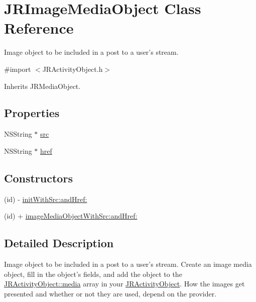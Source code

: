 \hypertarget{interface_j_r_image_media_object}{
\section{JRImageMediaObject Class Reference}
\label{interface_j_r_image_media_object}
}


Image object to be included in a post to a user's stream.  




{\ttfamily \#import $<$JRActivityObject.h$>$}



Inherits JRMediaObject.

\subsection*{Properties}
\begin{DoxyCompactItemize}
\item 
NSString $\ast$ \hyperlink{interface_j_r_image_media_object_aad75823f9189dfca758bc4d4712c3621}{src}
\item 
NSString $\ast$ \hyperlink{interface_j_r_image_media_object_a95642c3f4bc97a112a3ab32beef46f66}{href}
\end{DoxyCompactItemize}
\subsection*{Constructors}
\label{_amgrp559a25fdb98a7d1fd1c3771ac568d5e9}
 \begin{DoxyCompactItemize}
\item 
(id) -\/ \hyperlink{interface_j_r_image_media_object_a8a15f579b784dbdcdaeea9dc1da56cb3}{initWithSrc:andHref:}
\item 
(id) + \hyperlink{interface_j_r_image_media_object_af1e6318b91ab6cda8eba464767b2c81d}{imageMediaObjectWithSrc:andHref:}
\end{DoxyCompactItemize}


\subsection{Detailed Description}
Image object to be included in a post to a user's stream. Create an image media object, fill in the object's fields, and add the object to the \hyperlink{interface_j_r_activity_object_a2e4ff78f83d0f353f8e0c17ed48ce0ab}{JRActivityObject::media} array in your \hyperlink{interface_j_r_activity_object}{JRActivityObject}. How the images get presented and whether or not they are used, depend on the provider.

